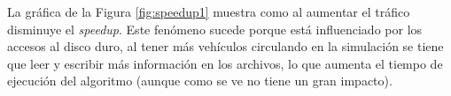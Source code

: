La gráfica de la Figura \ref{fig:speedup1} muestra como al aumentar el tráfico disminuye el \emph{speedup}. Este fenómeno sucede porque está influenciado por los accesos al disco duro, al tener más vehículos circulando en la simulación se tiene que leer y escribir más información en los archivos, lo que aumenta el tiempo de ejecución del algoritmo (aunque como se ve no tiene un gran impacto).